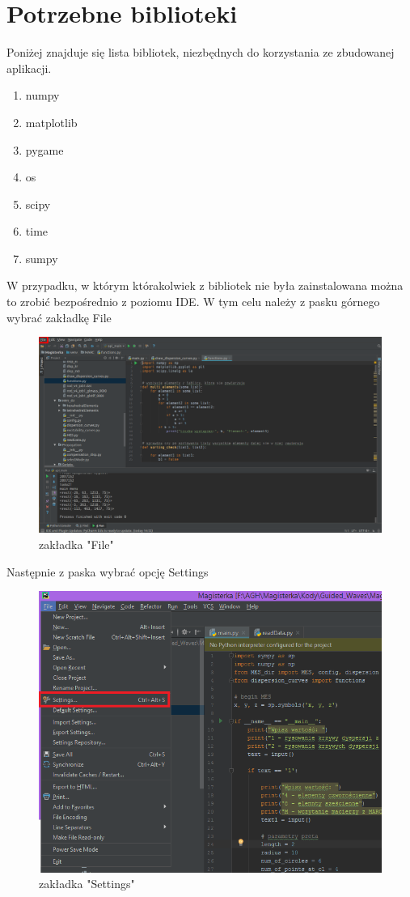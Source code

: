 \section{Potrzebne biblioteki}

Poniżej znajduje się lista bibliotek, niezbędnych do korzystania ze zbudowanej aplikacji.

\begin{enumerate}
\item numpy
\item matplotlib
\item pygame
\item os
\item scipy
\item time
\item sumpy
\end{enumerate}

W przypadku, w którym którakolwiek z bibliotek nie była zainstalowana można to zrobić bezpośrednio z poziomu IDE. W tym celu należy z pasku górnego wybrać zakładkę File

\begin{figure}[h]
\centering
\includegraphics[width=13cm]{Zdjecia/5/kasia/file}
\caption{zakładka "File"}
\label{fig:file}
\end{figure}

Następnie z paska wybrać opcję Settings

\begin{figure}[h]
\centering
\includegraphics[width=13cm]{Zdjecia/5/kasia/settings}
\caption{zakładka "Settings"}
\label{fig:file}
\end{figure}


